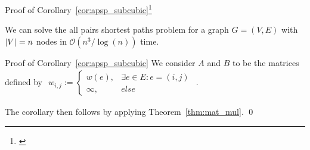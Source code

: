 \begin{frame}{Proof of Corollary~\ref{cor:apsp_subcubic}\footnote[1]{\cite[Corollary~3.3]{Chan2007}}}
    \setcounter{theorem}{3}
    \begin{corollary}
        We can solve the all pairs shortest paths problem for a graph $G = (V, E)$ with $\left\lvert V\right\rvert_{} = n$ nodes in $\mathcal{O}\left( n^3 / \log(n) \right)$ time.
    \end{corollary}
\end{frame}

\begin{frame}{Proof of Corollary~\ref{cor:apsp_subcubic}}
    We consider $A$ and $B$ to be the matrices defined by $\begin{aligned}w_{i, j} := \begin{cases}
        w(e), &\exists e \in E: e = (i, j) \\
        \infty, &else
    \end{cases}\end{aligned}$.

    The corollary then follows by applying Theorem~\ref{thm:mat_mul}. \qed{}
\end{frame}
